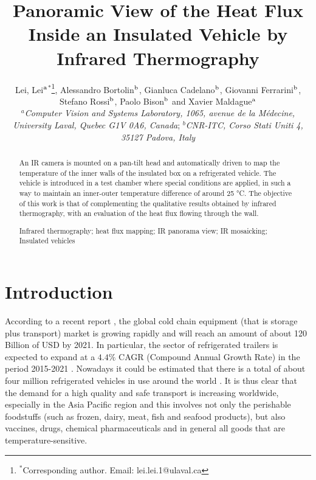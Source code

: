 \documentclass{tQRT2e}
\begin{document}


\title{Panoramic View of the Heat Flux Inside an Insulated Vehicle by Infrared Thermography}

\author{Lei, Lei$^{\rm a}$$^{\ast}$\thanks{$^\ast$Corresponding author. Email: lei.lei.1@ulaval.ca
		\vspace{6pt}},  Alessandro Bortolin$^{\rm b}$, Gianluca Cadelano$^{\rm b}$, Giovanni Ferrarini$^{\rm b}$, Stefano Rossi$^{\rm b}$, Paolo Bison$^{\rm b}$ and Xavier Maldague$^{\rm a}$ \\\vspace{6pt}  $^{a}${\em{Computer Vision and Systems Laboratory, 1065, avenue de la Médecine, University Laval, Quebec G1V 0A6, Canada}};
	$^{b}${\em{CNR-ITC, Corso Stati Uniti 4, 35127 Padova, Italy}} \\\received{} }

\maketitle

\begin{abstract}
	An IR camera is mounted on a pan-tilt head and automatically driven to map the temperature of the inner walls of the insulated box on a refrigerated vehicle. The vehicle is introduced in a test chamber where special conditions are applied, in such a way to maintain an inner-outer temperature difference of around 25 °C. The objective of this work is that of complementing the qualitative results obtained by infrared thermography, with an evaluation of the heat flux flowing through the wall.
	
\begin{keywords} Infrared thermography; heat flux mapping; IR panorama view; IR mosaicking; Insulated vehicles 
\end{keywords}
\end{abstract}

%
%
\section{Introduction}
According to a recent report \cite{Zion2016}, the global cold chain equipment (that is storage plus transport) market is growing rapidly and will reach an amount of about 120 Billion of USD by 2021. In particular, the sector of refrigerated trailers is expected to expand at a $ 4.4\% $ CAGR (Compound Annual Growth Rate) in the period 2015-2021 \cite{RM2015}. Nowadays it could be estimated that there is a total of about four million refrigerated vehicles in use around the world \cite{UNEP2010}. It is thus clear that the demand for a high quality and safe transport is increasing worldwide, especially in the Asia Pacific region and this involves not only the perishable foodstuffs (such as frozen, dairy, meat, fish and seafood products), but also vaccines, drugs, chemical pharmaceuticals and in general all goods that are temperature-sensitive. 
\end{document}
